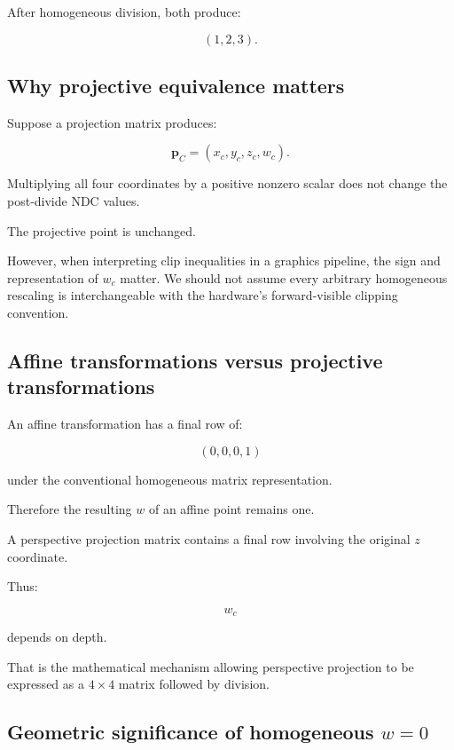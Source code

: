 After homogeneous division, both produce:

\[
 (1,2,3).
\]

\subsection{Why projective equivalence matters}\label{02-foundations-ii-ch033-why-projective-equivalence-matters}

Suppose a projection matrix produces:

\[
 \mathbf p_C=(x_c,y_c,z_c,w_c).
\]

Multiplying all four coordinates by a positive nonzero scalar does not change the post-divide NDC values.

The projective point is unchanged.

However, when interpreting clip inequalities in a graphics pipeline, the sign and representation of \(w_c\) matter. We should not assume every arbitrary homogeneous rescaling is interchangeable with the hardware's forward-visible clipping convention.

\subsection{Affine transformations versus projective transformations}\label{02-foundations-ii-ch033-affine-transformations-versus-projective-transformations}

An affine transformation has a final row of:

\[
 (0,0,0,1)
\]

under the conventional homogeneous matrix representation.

Therefore the resulting \(w\) of an affine point remains one.

A perspective projection matrix contains a final row involving the original \(z\) coordinate.

Thus:

\[
 w_c
\]

depends on depth.

That is the mathematical mechanism allowing perspective projection to be expressed as a \(4\times4\) matrix followed by division.

\subsection{\texorpdfstring{Geometric significance of homogeneous \(w=0\)}{Geometric significance of homogeneous w=0}}\label{02-foundations-ii-ch033-geometric-significance-of-homogeneous-w0}

